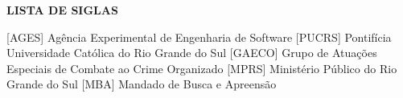 
\begin{center}
  \uppercase{\bfseries lista de siglas}\\[3em]
\end{center}

\begin{acronym}[XXXXXXXX]
   [AGES] {Agência Experimental de Engenharia de Software}
   [PUCRS] {Pontifícia Universidade Católica do Rio Grande do Sul}
   [GAECO] {Grupo de Atuações Especiais de Combate ao Crime Organizado}
   [MPRS] {Ministério Público do Rio Grande do Sul}
   [MBA] {Mandado de Busca e Apreensão}
\end{acronym}